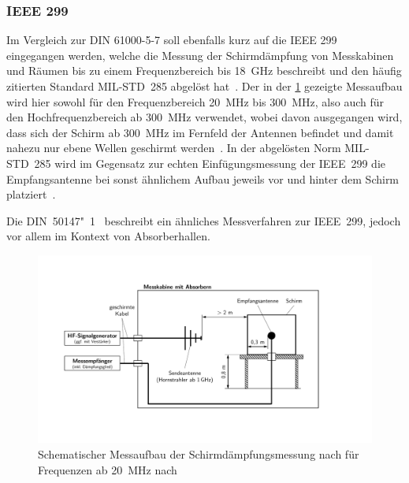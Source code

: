 
\subsubsection{IEEE 299}

Im Vergleich zur DIN 61000-5-7 soll ebenfalls kurz auf die IEEE 299~\cite{IEEE_299} eingegangen werden, welche die Messung der Schirmdämpfung von Messkabinen und Räumen bis zu einem Frequenzbereich bis \SI{18}{\giga\hertz} beschreibt und den häufig zitierten Standard MIL-STD~285 abgelöst hat~\cite{EM_Schirmung}. Der in der \Abb\ref{fig:2_Schematik-Schirmdaempfungsmessung_IEEE_299} gezeigte Messaufbau wird hier sowohl für den Frequenzbereich \SI{20}{\mega\hertz} bis \SI{300}{\mega\hertz}, also auch für den Hochfrequenzbereich ab \SI{300}{\mega\hertz} verwendet, wobei davon ausgegangen wird, dass sich der Schirm ab \SI{300}{\mega\hertz} im Fernfeld der Antennen befindet und damit nahezu nur ebene Wellen geschirmt \mbox{werden}~\cite{EM_Schirmung, IEEE_299}. In der abgelösten Norm MIL-STD~285 wird im Gegensatz zur echten Einfügungsmessung der IEEE~299 die Empfangsantenne bei sonst ähnlichem Aufbau jeweils vor und hinter dem Schirm platziert~\cite{EM_Schirmung}.
\par
\vspace{\linespace}
Die DIN~50147"~1~\cite{DIN_EN_50147-1} beschreibt ein ähnliches Messverfahren zur IEEE~299, jedoch vor allem im Kontext von Absorberhallen.  

\begin{figure}[ht]
    \centering
    \includegraphics[page = 2, trim = 2cm 3cm 4cm 3cm, clip, width=.9\textwidth]{Abbildungen/Kapitel2/Schematiken_Schirmdaempfungsmessung.pdf}
    \caption[Schematischer Messaufbau der Schirmdämpfungsmessung nach \citeauthor{IEEE_299} für Frequenzen ab \SI{20}{\mega\hertz}]{Schematischer Messaufbau der Schirmdämpfungsmessung nach \citeauthor{IEEE_299} für Frequenzen ab \SI{20}{\mega\hertz} nach~\cite{IEEE_299}}
    \label{fig:2_Schematik-Schirmdaempfungsmessung_IEEE_299}
\end{figure}


